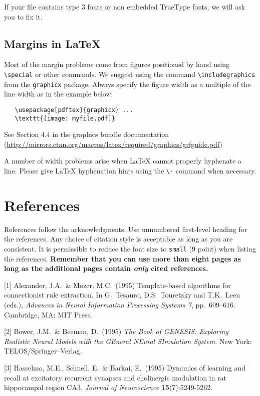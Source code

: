 \documentclass{article}
\begin{document}
If your file contains type 3 fonts or non embedded TrueType fonts, we will ask
you to fix it.

\subsection{Margins in \LaTeX{}}

Most of the margin problems come from figures positioned by hand using
\verb+\special+ or other commands. We suggest using the command
\verb+\includegraphics+ from the \verb+graphicx+ package. Always specify the
figure width as a multiple of the line width as in the example below:
\begin{verbatim}
   \usepackage[pdftex]{graphicx} ...
   \texttt{[image: myfile.pdf]}
\end{verbatim}
See Section 4.4 in the graphics bundle documentation
(\url{http://mirrors.ctan.org/macros/latex/required/graphics/grfguide.pdf})

A number of width problems arise when \LaTeX{} cannot properly hyphenate a
line. Please give LaTeX hyphenation hints using the \verb+\-+ command when
necessary.



\section*{References}

References follow the acknowledgments. Use unnumbered first-level heading for
the references. Any choice of citation style is acceptable as long as you are
consistent. It is permissible to reduce the font size to \verb+small+ (9 point)
when listing the references. {\bf Remember that you can use more than eight
  pages as long as the additional pages contain \emph{only} cited references.}
\medskip

\small

[1] Alexander, J.A.\ \& Mozer, M.C.\ (1995) Template-based algorithms for
connectionist rule extraction. In G.\ Tesauro, D.S.\ Touretzky and T.K.\ Leen
(eds.), {\it Advances in Neural Information Processing Systems 7},
pp.\ 609--616. Cambridge, MA: MIT Press.

[2] Bower, J.M.\ \& Beeman, D.\ (1995) {\it The Book of GENESIS: Exploring
  Realistic Neural Models with the GEneral NEural SImulation System.}  New York:
TELOS/Springer--Verlag.

[3] Hasselmo, M.E., Schnell, E.\ \& Barkai, E.\ (1995) Dynamics of learning and
recall at excitatory recurrent synapses and cholinergic modulation in rat
hippocampal region CA3. {\it Journal of Neuroscience} {\bf 15}(7):5249-5262.
\end{document}
